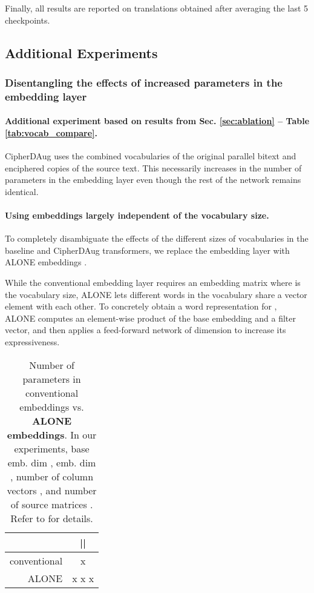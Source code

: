 \documentclass[11pt]{article}
\begin{document}
Finally, all results are reported on translations obtained after averaging the last 5 checkpoints.


\subsection{Additional Experiments}

\subsubsection{Disentangling the effects of increased parameters in the embedding layer}

\paragraph{Additional experiment based on results from Sec. \ref{sec:ablation} -- Table \ref{tab:vocab_compare}.}CipherDAug uses the combined vocabularies of the original parallel bitext and enciphered copies of the source text. This necessarily increases in the number of parameters in the embedding layer even though the rest of the network remains identical. 


\paragraph{Using embeddings largely independent of the vocabulary size.} To completely disambiguate the effects of the different sizes of vocabularies in the baseline and CipherDAug transformers, we replace the embedding layer with ALONE embeddings \cite{alone-neurips20}.

While the conventional embedding layer requires an embedding matrix  where  is the vocabulary size, ALONE lets different words in the vocabulary share a vector element with each other. To concretely obtain a word representation for , ALONE computes an element-wise product of the base embedding   and a filter vector, and then applies a feed-forward network of dimension  to increase its expressiveness. 

\begin{table}[ht]
\scriptsize
\centering
\begin{tabular}{rc}
\toprule
 & \textbf{||} \\ \midrule
conventional &   x  \\
ALONE &  x  x  x  \\
\bottomrule
\end{tabular}
\caption{Number of parameters in conventional embeddings vs. \textbf{ALONE embeddings}. In our experiments, base emb. dim , emb. dim , number of column vectors , and number of source matrices . Refer to \citet{alone-neurips20} for details.}
\label{tab:alone_details}
\end{table}
\end{document}
